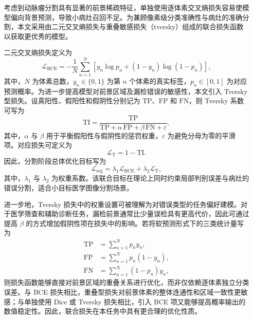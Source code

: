 考虑到动脉瘤分割具有显著的前景稀疏特征，单独使用逐体素交叉熵损失容易使模型偏向背景预测，导致小病灶召回不足。为兼顾像素级分类准确性与病灶的准确分割，本文采用由二元交叉熵损失与重叠敏感损失（tversky）组成的联合损失函数以获取更优秀的模型。

二元交叉熵损失定义为
\begin{equation}
\mathcal{L}_{\mathrm{BCE}} = -\frac{1}{N}\sum_{n=1}^{N}\left[y_n\log p_n + (1-y_n)\log(1-p_n)\right],
\end{equation}
其中，$N$ 为体素总数，$y_n\in\{0,1\}$ 为第 $n$ 个体素的真实标签，$p_n\in[0,1]$ 为对应预测概率。为进一步提高模型对前景区域及漏检错误的敏感性，本文引入 Tversky 型损失。设真阳性、假阳性和假阴性分别记为 $\mathrm{TP}$、$\mathrm{FP}$ 和 $\mathrm{FN}$，则 Tversky 系数可写为
\begin{equation}
\mathrm{TI} = \frac{\mathrm{TP}}{\mathrm{TP}+\alpha\,\mathrm{FP}+\beta\,\mathrm{FN}+\varepsilon},
\end{equation}
其中，$\alpha$ 与 $\beta$ 用于平衡假阳性与假阴性的惩罚权重，$\varepsilon$ 为避免分母为零的平滑项。对应损失可定义为
\begin{equation}
\mathcal{L}_{\mathrm{T}} = 1-\mathrm{TI}.
\end{equation}
因此，分割阶段总体优化目标写为
\begin{equation}
\mathcal{L}_{\mathrm{seg}} = \lambda_1\mathcal{L}_{\mathrm{BCE}} + \lambda_2\mathcal{L}_{\mathrm{T}},
\end{equation}
其中，$\lambda_1$ 与 $\lambda_2$ 为权重系数。该联合目标在理论上同时约束局部判别误差与病灶的错误分割，适合小目标医学图像分割场景。

进一步地，Tversky 损失中的权重设置可被理解为对错误类型的任务偏好建模。对于医学筛查和辅助诊断任务，漏检前景通常比少量误检具有更高代价，因此可通过提高 $\beta$ 的方式增加假阴性项在损失中的影响。若将软预测形式下的三类统计量写为
\begin{align}
\mathrm{TP}&=\sum_{n=1}^{N}p_ny_n,\\
\mathrm{FP}&=\sum_{n=1}^{N}p_n(1-y_n),\\
\mathrm{FN}&=\sum_{n=1}^{N}(1-p_n)y_n,
\end{align}
则损失函数能够直接对前景区域的重叠关系进行优化，而非仅依赖逐体素独立分类误差。与 BCE 损失相比，重叠型损失对前景体素的整体连通性和区域一致性更敏感；与单独使用 Dice 或 Tversky 损失相比，引入 BCE 项又能够提高概率输出的数值稳定性。因此，联合损失在本任务中具有更合理的优化性质。

